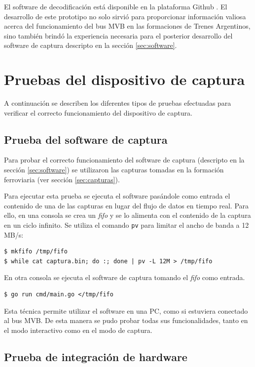 El software de decodificación está disponible en la plataforma Github \cite{mvbparse-py}. El desarrollo de este prototipo no solo sirvió para proporcionar información valiosa acerca del funcionamiento del bus MVB en las formaciones de Trenes Argentinos, sino también brindó la experiencia necesaria para el posterior desarrollo del software de captura descripto en la sección \ref{sec:software}.

\section{Pruebas del dispositivo de captura}

A continuación se describen los diferentes tipos de pruebas efectuadas para verificar el correcto funcionamiento del dispositivo de captura.

\subsection{Prueba del software de captura}

Para probar el correcto funcionamiento del software de captura (descripto en la sección \ref{sec:software}) se utilizaron las capturas tomadas en la formación ferroviaria (ver sección \ref{sec:capturas}).

Para ejecutar esta prueba se ejecuta el software pasándole como entrada el contenido de una de las capturas en lugar del flujo de datos en tiempo real. Para ello, en una consola se crea un \textit{fifo} y se lo alimenta con el contenido de la captura en un ciclo infinito. Se utiliza el comando \texttt{pv} \cite{pv} para limitar el ancho de banda a 12 MB/s:

\begin{lstlisting}
$ mkfifo /tmp/fifo
$ while cat captura.bin; do :; done | pv -L 12M > /tmp/fifo
\end{lstlisting}

En otra consola se ejecuta el software de captura tomando el \textit{fifo} como entrada.

\begin{lstlisting}
$ go run cmd/main.go </tmp/fifo
\end{lstlisting}

Esta técnica permite utilizar el software en una PC, como si estuviera conectado al bus MVB.
De esta manera se pudo probar todas sus funcionalidades, tanto en el modo interactivo como en el modo de captura.

\subsection{Prueba de integración de hardware}

